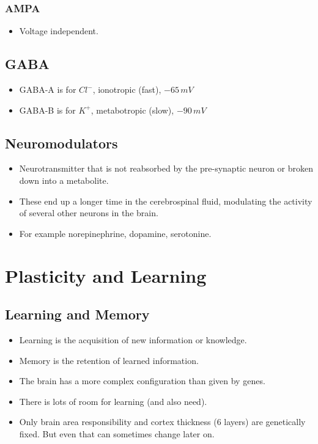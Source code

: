 \documentclass[a4paper, 12pt]{article}
\begin{document}
\subsubsection{AMPA}
\begin{itemize}[noitemsep,nolistsep]
	\item Voltage independent.
\end{itemize}

\subsection{GABA}
\begin{itemize}[noitemsep,nolistsep]
	\item GABA-A is for $Cl^-$, ionotropic (fast), $-65\,mV$
	\item GABA-B is for $K^+$, metabotropic (slow), $-90\,mV$
\end{itemize}

\subsection{Neuromodulators}
\begin{itemize}[noitemsep,nolistsep]
	\item Neurotransmitter that is not reabsorbed by the pre-synaptic neuron or broken down into a metabolite.
	\item These end up a longer time in the cerebrospinal fluid, modulating the activity of several other neurons in the brain.
	\item For example norepinephrine, dopamine, serotonine.
\end{itemize}

\section{Plasticity and Learning}
\subsection{Learning and Memory}
\begin{itemize}[noitemsep,nolistsep]
	\item Learning is the acquisition of new information or knowledge.
	\item Memory is the retention of learned information.
	\item The brain has a more complex configuration than given by genes.
	\item There is lots of room for learning (and also need).
	\item Only brain area responsibility and cortex thickness (6 layers) are genetically fixed. But even that can sometimes change later on.
\end{itemize}
\end{document}
